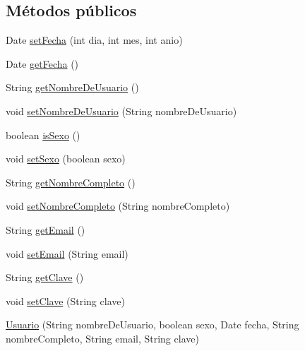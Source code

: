 \subsection*{Métodos públicos}
\begin{DoxyCompactItemize}
\item 
Date \hyperlink{classcom_1_1ucab_1_1javachat_1_1_servidor_1_1model_1_1_usuario_a67f151ed25f6ca94c56acd260ac09a69}{set\-Fecha} (int dia, int mes, int anio)
\item 
Date \hyperlink{classcom_1_1ucab_1_1javachat_1_1_servidor_1_1model_1_1_usuario_ad08163d55a8c2614eaa16dafcab8964a}{get\-Fecha} ()
\item 
String \hyperlink{classcom_1_1ucab_1_1javachat_1_1_servidor_1_1model_1_1_usuario_a52fa249d62eff30d8466b14f7422b774}{get\-Nombre\-De\-Usuario} ()
\item 
void \hyperlink{classcom_1_1ucab_1_1javachat_1_1_servidor_1_1model_1_1_usuario_a80796a87691a85cb47442b420aabd004}{set\-Nombre\-De\-Usuario} (String nombre\-De\-Usuario)
\item 
boolean \hyperlink{classcom_1_1ucab_1_1javachat_1_1_servidor_1_1model_1_1_usuario_a64cf2949f9c329b09c802f9f74325b21}{is\-Sexo} ()
\item 
void \hyperlink{classcom_1_1ucab_1_1javachat_1_1_servidor_1_1model_1_1_usuario_a77f06fad76898b3b42d440bf9b6e3297}{set\-Sexo} (boolean sexo)
\item 
String \hyperlink{classcom_1_1ucab_1_1javachat_1_1_servidor_1_1model_1_1_usuario_a65aa2651b1681f4ef2d8a03c1fc5a9d4}{get\-Nombre\-Completo} ()
\item 
void \hyperlink{classcom_1_1ucab_1_1javachat_1_1_servidor_1_1model_1_1_usuario_a5450b7564eae85749988170bc27e9f4b}{set\-Nombre\-Completo} (String nombre\-Completo)
\item 
String \hyperlink{classcom_1_1ucab_1_1javachat_1_1_servidor_1_1model_1_1_usuario_a62a69897b00dc760eda6401c003e0201}{get\-Email} ()
\item 
void \hyperlink{classcom_1_1ucab_1_1javachat_1_1_servidor_1_1model_1_1_usuario_aa4f8f9ea1493e0116f44a79bf265d290}{set\-Email} (String email)
\item 
String \hyperlink{classcom_1_1ucab_1_1javachat_1_1_servidor_1_1model_1_1_usuario_a2020589e80c54523b0598f728d1db13d}{get\-Clave} ()
\item 
void \hyperlink{classcom_1_1ucab_1_1javachat_1_1_servidor_1_1model_1_1_usuario_a0335592bf0c6db9fd52a32dfed8dc74e}{set\-Clave} (String clave)
\item 
\hyperlink{classcom_1_1ucab_1_1javachat_1_1_servidor_1_1model_1_1_usuario_a872f8793c72bd2c849e581556ca3edc7}{Usuario} (String nombre\-De\-Usuario, boolean sexo, Date fecha, String nombre\-Completo, String email, String clave)

\end{DoxyCompactItemize}
